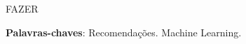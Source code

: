 \documentclass[
	12pt,				%
    oneside,			%
	a4paper,			%
	english,			%
	french,				%
	spanish,			%
	brazil,				%
	]{abntex2}
\begin{document}
\frenchspacing 


\imprimircapa

\imprimirfolhaderosto*






\begin{resumo} %
 FAZER

 \vspace{\onelineskip}
    
 \noindent
 \textbf{Palavras-chaves}: Recomendações. Machine Learning. 
\end{resumo} %


\cleardoublepage %


\cleardoublepage

\end{document}
